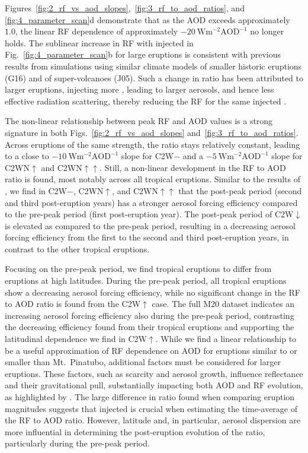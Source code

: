 \documentclass[draft]{agujournal2019}
\newcommand{\iso}[1][i]{{#1}njected \ce{SO2}}
\newcommand{\cwm}{C2W\(\downarrow\)}
\newcommand{\cwmp}{C2W\(-\)}
\newcommand{\cws}{C2WN\(\uparrow\)}
\newcommand{\cwss}{C2WN\(\uparrow\uparrow\)}
\newcommand{\cwsn}{C2W\(\uparrow\)}
\begin{document}
Figures~\ref{fig:2_rf_vs_aod_slopes},~\ref{fig:3_rf_to_aod_ratios}, and
\ref{fig:4_parameter_scan}d demonstrate that as the AOD exceeds approximately \(1.0\),
the linear RF dependence of approximately
\(\SI{-20}{\watt\metre^{-2}\mathrm{AOD}^{-1}}\) no longer holds. The sublinear increase
in RF with \iso{} in Fig.~\ref{fig:4_parameter_scan}b for large eruptions is consistent
with previous results from simulations using similar climate models of smaller historic
eruptions (G16) and of super-volcanoes (J05). Such a change in ratio has been attributed
to larger eruptions, injecting more , leading to larger aerosols, and hence less
effective radiation scattering, thereby reducing the RF for the same \iso{}
\cite{english2013, timmreck2010, timmreck2018}.

The non-linear relationship between peak RF and AOD values is a strong signature in both
Figs.~\ref{fig:2_rf_vs_aod_slopes} and~\ref{fig:3_rf_to_aod_ratios}. Across eruptions of
the same strength, the ratio stays relatively constant, leading to a close to
\(\SI{-10}{\watt\metre^{-2}\mathrm{AOD}^{-1}}\) slope for \cwmp{} and a
\(\SI{-5}{\watt\metre^{-2}\mathrm{AOD}^{-1}}\) slope for \cws{} and \cwss{}. Still, a
non-linear development in the RF to AOD ratio is found, most notably across all tropical
eruptions. Similar to the results of , we find in \cwmp{}, \cws{},
and \cwss{} that the post-peak period (second and third post-eruption years) has a
stronger aerosol forcing efficiency compared to the pre-peak period (first post-eruption
year). The post-peak period of \cwm{} is elevated as compared to the pre-peak period,
resulting in a decreasing aerosol forcing efficiency from the first to the second and
third post-eruption years, in contrast to the other tropical eruptions.

Focusing on the pre-peak period, we find tropical eruptions to differ from eruptions at
high latitudes. During the pre-peak period, all tropical eruptions show a decreasing
aerosol forcing efficiency, while no significant change in the RF to AOD ratio is found
from the \cwsn{} case. The full M20 dataset indicates an increasing aerosol forcing
efficiency also during the pre-peak period, contrasting the decreasing efficiency found
from their tropical eruptions and supporting the latitudinal dependence we find in
\cwsn{}. While we find a linear relationship to be a useful approximation of RF
dependence on AOD for eruptions similar to or smaller than Mt.\ Pinatubo, additional
factors must be considered for larger eruptions. These factors, such as  scarcity
and aerosol growth, influence reflectance and their gravitational pull, substantially
impacting both AOD and RF evolution, as highlighted by . The large
difference in ratio found when comparing eruption magnitudes suggests that \iso{} is
crucial when estimating the time-average of the RF to AOD ratio. However, latitude and,
in particular, aerosol dispersion are more influential in determining the post-eruption
evolution of the ratio, particularly during the pre-peak period.
\end{document}
